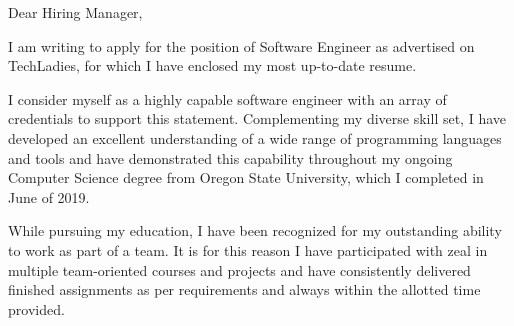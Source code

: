 \documentclass[11pt]{letter} %
\begin{document}

\begin{letter}{}



\signature{Megan Goossens} %


\opening{Dear Hiring Manager,} 
 
I am writing to apply for the position of {Software Engineer} as advertised on
{TechLadies}, for which I have enclosed my most up-to-date resume.

I consider myself as a highly capable software engineer with an array of
credentials to support this statement. Complementing my diverse skill set, I
have developed an excellent understanding of a wide range of programming
languages and tools and have demonstrated this capability throughout my ongoing
Computer Science degree from Oregon State University, which I completed in June
of 2019.

While pursuing my education, I have been recognized for my outstanding ability
to work as part of a team. It is for this reason I have participated with zeal
in multiple team-oriented courses and projects and have consistently delivered
finished assignments as per requirements and always within the allotted time
provided.


\end{letter}
\end{document}
